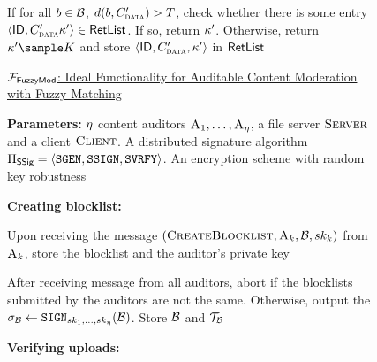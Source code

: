 \begin{figure}[h]
{\begin{minipage}[t]{\textwidth}

		\item If for all $\genericBlocklistElmt \in \blocklist$, $\distanceNotation[\distance][\genericBlocklistElmt][\clientMeta'] > \threshold$,  check whether there is some entry $\langle \genericFileID, \clientMeta' \genericSymmKey' \rangle \in \retList$. If so, return $\kappa'$. Otherwise, return $\genericSymmKey' \getsr \encryptKeySpace$ and store $\langle \genericFileID, \clientMeta', \genericSymmKey' \rangle$ in $\mathsf{RetList}$

		
		\itemListEnd



		\enumListEnd

		\enumListEnd

	\iffalse 
\bigskip\noindent\underline{$\mathcal{F}_{\mathsf{FuzzyMod}}$: Ideal Functionality for Auditable Content Moderation with Fuzzy Matching}
		
		
		\smallskip\noindent\textbf{Parameters:} $\eta$ content auditors $\auditor[1], \dots, \auditor[\numAuditors]$, a file server $\textsc{Server}$ and a client $\textsc{Client}$. A distributed signature algorithm $\sigSchemeDefn$. An encryption scheme with random key robustness \encryptionSchemeDefn
		
		\smallskip\noindent\textbf{Creating blocklist:} 
		\enumListStart
		
		\item	Upon receiving the message $(\createBlocklist, \auditor[\auditorIdx], \blocklist, \privKey[\auditorIdx])$ from $			\auditor[\auditorIdx]$, store the blocklist and the auditor's private key

		\item After receiving \createBlocklist message from all auditors, abort if the blocklists submitted by the auditors are not the 			same. Otherwise, output the \blklistToken $\genericBlocklistToken \assign \sign[\privKey[1], \dots, \privKey[\numAuditors]](\blocklist)$. Store $\blocklist$ and $\blklistToken$

		\enumListEnd
		
		\smallskip\noindent\textbf{Verifying uploads:} 
		
	
	



\end{minipage}}
\end{figure}
